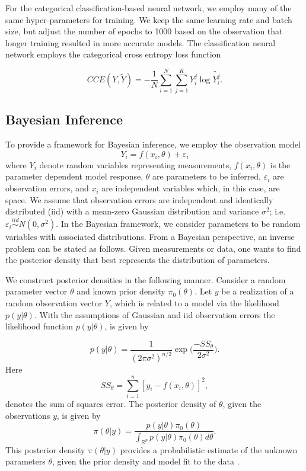 \documentclass[sn-mathphys-ay]{sn-jnl}
\begin{document}
For the categorical classification-based neural network, we employ many of the same hyper-parameters for training. We keep the same learning rate and batch size, but adjust the number of epochs to 1000 based on the observation that longer training resulted in more accurate models. The classification neural network employs the categorical cross entropy loss function

\begin{equation}
\label{eq:CCE}
CCE(Y,\tilde{Y})=-\frac{1}{N} \sum_{i=1}^N \sum_{j=1}^K Y_i^j \log{\tilde{Y_i^j}}.
\end{equation}


\subsection{Bayesian Inference}
\label{sec:Bayesian_inf}
To provide a framework for Bayesian inference, we employ the observation model
\[Y_i=f(x_i,\theta)+\varepsilon_i\]
where $Y_i$ denote random variables representing measurements, $f(x_i,\theta)$ is the parameter dependent model response, $\theta$ are parameters to be inferred, $\varepsilon_i$ are observation errors, and $x_i$ are independent variables which, in this case, are space. We assume that observation errors are independent and identically distributed (iid) with a mean-zero Gaussian distribution and variance $\sigma^2$; i.e. $\varepsilon_i \stackrel{iid}{\sim} N(0,\sigma^2)$. In the Bayesian framework, we consider parameters to be random variables with associated distributions. From a Bayesian perspective, an inverse problem can be stated as follows. Given measurements or data, one wants to find the posterior density that best represents the distribution of parameters.

We construct posterior densities in the following manner. Consider a random parameter vector $\theta$ and known prior density $\pi_0(\theta)$. Let $y$ be a realization of a random observation vector $Y$, which is related to a model via the likelihood $p(y| \theta)$. With the assumptions of Gaussian and iid observation errors the likelihood function $p(y|\theta)$, is given by

\[
    p(y|\theta) = \frac{1}{\left(2\pi\sigma^2\right)^{n/2}} \exp{\Big(\frac{-SS_\theta}{2\sigma^2}\Big)}.
\]
Here
\[
    SS_\theta = \sum_{i=1}^n[y_i-f(x_i,\theta)]^2,
\]
denotes the sum of squares error. The posterior density of $\theta$, given the observations $y$, is given by
\begin{equation}
\label{eq:Bayes}
\pi(\theta | y)=\frac{p(y|\theta) \pi_0(\theta) }{\int_{\mathbb{R}^p} p(y|\theta) \pi_0 (\theta) d\theta}.
\end{equation}
This posterior density $\pi(\theta | y)$ provides a probabilistic estimate of the unknown parameters $\theta$, given the prior density and model fit to the data \citep{kaipio2006,Smith2013Uncertainty}.
\end{document}

